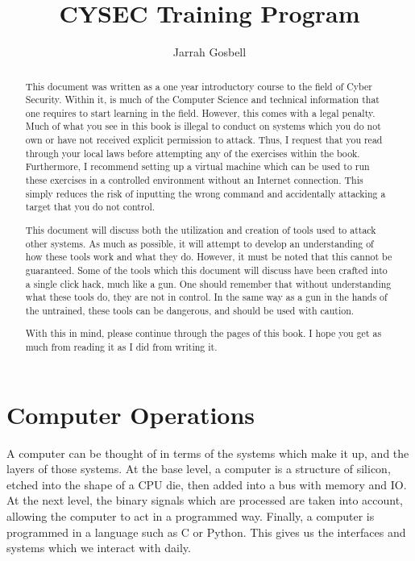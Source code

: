 \documentclass[a4paper,11pt]{report}
\author{Jarrah Gosbell}
\title{CYSEC Training Program}
\begin{document}
\maketitle
\tableofcontents
\begin{abstract}
	This document was written as a one year introductory course to the field of Cyber Security. 
	Within it, is much of the Computer Science and technical information that one requires to start learning in the field. 
	However, this comes with a legal penalty. 
	Much of what you see in this book is illegal to conduct on systems which you do not own or have not received explicit permission to attack. 
	Thus, I request that you read through your local laws before attempting any of the exercises within the book. 
	Furthermore, I recommend setting up a virtual machine which can be used to run these exercises in a controlled environment without an Internet connection. 
	This simply reduces the risk of inputting the wrong command and accidentally attacking a target that you do not control. 

	This document will discuss both the utilization and creation of tools used to attack other systems. 
	As much as possible, it will attempt to develop an understanding of how these tools work and what they do. 
	However, it must be noted that this cannot be guaranteed. 
	Some of the tools which this document will discuss have been crafted into a single click hack, much like a gun. 
	One should remember that without understanding what these tools do, they are not in control. 
	In the same way as a gun in the hands of the untrained, these tools can be dangerous, and should be used with caution. 

	With this in mind, please continue through the pages of this book. 
	I hope you get as much from reading it as I did from writing it. 
\end{abstract}
\chapter{Computer Operations}
	\label{ch:ComputerOperations}
	A computer can be thought of in terms of the systems which make it up, and the layers of those systems.
	At the base level, a computer is a structure of silicon, etched into the shape of a CPU die, then added into a bus with memory and IO.
	At the next level, the binary signals which are processed are taken into account, allowing the computer to act in a programmed way. 
	Finally, a computer is programmed in a language such as C or Python. This gives us the interfaces and systems which we interact with daily. 
\end{document}
